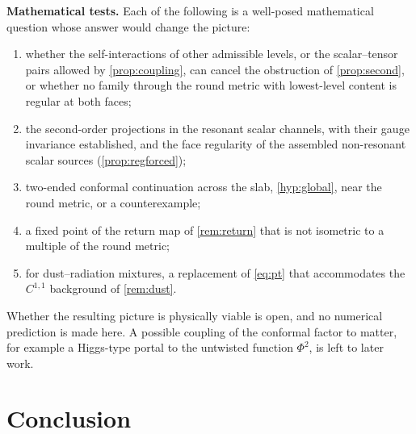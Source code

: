 \documentclass[11pt]{article}
\theoremstyle{canonmath}
\theoremstyle{canonpostulate}
\theoremstyle{canonproposition}
\theoremstyle{canonmath}
\theoremstyle{canonproposition}
\begin{document}
\textbf{Mathematical tests.} Each of the following is a well-posed mathematical question whose answer would change the picture:
\begin{enumerate}[label=(\roman*)]
\item whether the self-interactions of other admissible levels, or the scalar--tensor pairs allowed by \cref{prop:coupling}, can cancel the obstruction of \cref{prop:second}, or whether no family through the round metric with lowest-level content is regular at both faces;
\item the second-order projections in the resonant scalar channels, with their gauge invariance established, and the face regularity of the assembled non-resonant scalar sources (\cref{prop:regforced});
\item two-ended conformal continuation across the slab, \ref{hyp:global}, near the round metric, or a counterexample;
\item a fixed point of the return map of \cref{rem:return} that is not isometric to a multiple of the round metric;
\item for dust--radiation mixtures, a replacement of \eqref{eq:pt} that accommodates the $C^{1,1}$ background of \cref{rem:dust}.
\end{enumerate}

Whether the resulting picture is physically viable is open, and no numerical prediction is made here. A possible coupling of the conformal factor to matter, for example a Higgs-type portal to the untwisted function $\Phi^2$, is left to later work.

\section{Conclusion}
\label{sec:conclusion}
\end{document}
